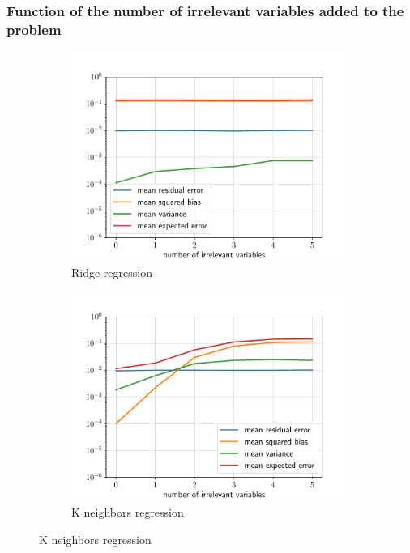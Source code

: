 \subsubsection*{Function of the number of irrelevant variables added to the problem}
\begin{figure}[H]
    \centering
    \begin{subfigure}{0.495\textwidth}
        \includegraphics[width=\textwidth]{resources/pdf/Q3e_Ridge_irrelevant_var.pdf}
        \caption{Ridge regression}
    \end{subfigure}
    \begin{subfigure}{0.495\textwidth}
        \includegraphics[width=\textwidth]{resources/pdf/Q3e_KNeighborsRegressor_irrelevant_var.pdf}
        \caption{K neighbors regression}
    \end{subfigure}
\end{figure}
